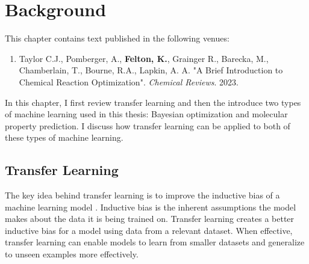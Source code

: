 \chapter{Background}\label{ch:background}

This chapter contains text published in the following venues:

\begin{enumerate}
\item Taylor C.J., Pomberger, A., \textbf{Felton, K.}, Grainger R., Barecka, M., Chamberlain, T., Bourne, R.A., Lapkin, A. A. "A Brief Introduction to Chemical Reaction Optimization". \textit{Chemical Reviews}. 2023.
\end{enumerate}

In this chapter, I first review transfer learning and then the introduce two types of machine learning used in this thesis: Bayesian optimization and molecular property prediction. I discuss how transfer learning can be applied to both of these types of machine learning.

\section{Transfer Learning}

The key idea behind transfer learning is to improve the inductive bias of a machine learning model \cite{Zhuang2021}. Inductive bias is the inherent assumptions the model makes about the data it is being trained on. Transfer learning creates a better inductive bias for a model using data from a relevant dataset. When effective, transfer learning can enable models to learn from smaller datasets and generalize to unseen examples more effectively. 

